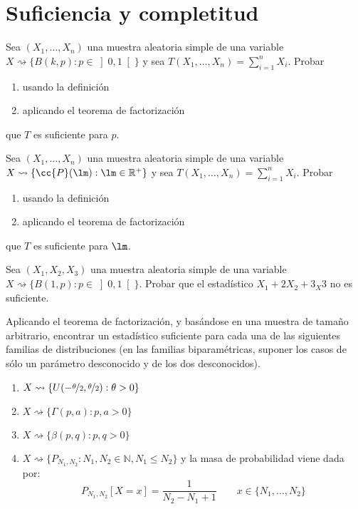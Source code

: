 \newpage
\section{Suficiencia y completitud}

\begin{ejercicio}
    Sea $(X_1, \ldots, X_n)$ una muestra aleatoria simple de una variable $X\rightsquigarrow\{B(k,p) : p\in \left]0,1\right[\}$ y sea $T(X_1, \ldots, X_n) = \sum\limits_{i=1}^n X_i$. Probar
    \begin{enumerate}[label=\alph*)]
        \item usando la definición
        \item aplicando el teorema de factorización
    \end{enumerate}
    que $T$ es suficiente para $p$.
\end{ejercicio}

\begin{ejercicio}
    Sea $(X_1, \ldots, X_n)$ una muestra aleatoria simple de una variable $X\rightsquigarrow\{\cc{P}(\lm) : \lm\in \mathbb{R}^+\}$ y sea $T(X_1, \ldots, X_n) = \sum\limits_{i=1}^n X_i$. Probar
    \begin{enumerate}[label=\alph*)]
        \item usando la definición
        \item aplicando el teorema de factorización
    \end{enumerate}
    que $T$ es suficiente para $\lm$.
\end{ejercicio}

\begin{ejercicio}
    Sea $(X_1, X_2, X_3)$ una muestra aleatoria simple de una variable $X\rightsquigarrow\{B(1,p) : p \in \left]0,1\right[\}$. Probar que el estadístico $X_1 + 2X_2 + 3_X3$ no es suficiente.
\end{ejercicio}

\begin{ejercicio}
    Aplicando el teorema de factorización, y basándose en una muestra de tamaño arbitrario, encontrar un estadístico suficiente para cada una de las siguientes familias de distribuciones (en las familias biparamétricas, suponer los casos de sólo un parámetro desconocido y de los dos desconocidos).
    \begin{enumerate}[label=\alph*)]
        \item $X\rightsquigarrow\{U(-\nicefrac{\theta}{2},\nicefrac{\theta}{2}) : \theta>0\}$
        \item $X\rightsquigarrow\{\Gamma(p,a) : p,a > 0\}$
        \item $X\rightsquigarrow\{\beta(p,q) : p,q>0\}$
        \item $X\rightsquigarrow\{P_{N_1,N_2} : N_1, N_2 \in \mathbb{N}, N_1 \leq N_2\}$ y la masa de probabilidad viene dada por:
            \begin{equation*}
                P_{N_1, N_2}[X=x] = \dfrac{1}{N_2 - N_1 + 1} \qquad x\in \{N_1, \ldots, N_2\}
            \end{equation*}
    \end{enumerate}
\end{ejercicio}

